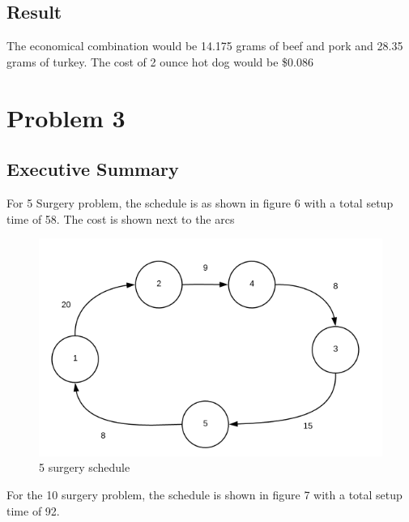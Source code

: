 \documentclass[]{article}
\begin{document}
\subsection{Result}\label{result}

The economical combination would be 14.175 grams of beef and pork and
28.35 grams of turkey. The cost of 2 ounce hot dog would be \$0.086

\section{Problem 3}\label{problem-3}

\subsection{Executive Summary}\label{executive-summary-2}

For 5 Surgery problem, the schedule is as shown in figure 6 with a total
setup time of 58. The cost is shown next to the arcs

\begin{figure}[h]

{\centering \includegraphics{Figures/Homework3/p3aS} 

}

\caption{5 surgery schedule}\label{fig:unnamed-chunk-6}
\end{figure}

For the 10 surgery problem, the schedule is shown in figure 7 with a
total setup time of 92.
\end{document}
